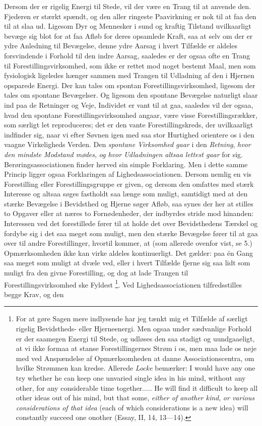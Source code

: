\documentclass[12pt,a4paper,openany]{book}
\newcommand{\opage}[1]{\marginnote{\footnotesize\textit{[#1]}}}
\begin{document}
Dersom der er rigelig Energi til Stede, vil der være en Trang til at anvende
den. Fjederen er stærkt spændt, og den aller ringeste Paavirkning er nok til at
faa den til at slaa ud. Ligesom Dyr og Mennesker i sund og kraftig Tilstand
uvilkaarligt bevæge sig blot for at faa Afløb for deres opsamlede Kraft, saa at
selv om der er ydre Anledning til
\setcounter{footnote}{0}%
\opage{54}Bevægelse, denne ydre Aarsag i hvert Tilfælde er aldeles forsvindende
i Forhold til den indre Aarsag, saaledes er der ogsaa ofte en Trang til
Forestillingsvirksomhed, som ikke er rettet mod noget bestemt Maal, men som
fysiologisk ligeledes hænger sammen med Trangen til Udladning af den i Hjernen
opsparede Energi. Der kan tales om spontan Forestillingsvirksomhed, ligesom der
tales om spontane Bevægelser. Og ligesom den spontane Bevægelse naturligt slaar
ind paa de Retninger og Veje, Individet er vant til at gaa, saaledes vil der
ogsaa, hvad den spontane Forestillingsvirksomhed angaar, være visse
Forestillingsrækker, som særligt let reproduceres; det er den vante
Forestillingskreds, der uvilkaarligt indfinder sig, naar vi efter Søvnen igen
med saa stor Hurtighed orientere os i den vaagne Virkeligheds Verden. Den
\emph{spontane Virksomhed gaar} i den \emph{Retning}, \emph{hvor den mindste
Modstand mødes}, \emph{og hvor Udladningen altsaa lettest gaar} for sig.
Berøringsassociationen finder herved sin simple Forklaring. Men i dette samme
Princip ligger ogsaa Forklaringen af Lighedsassociationen. Dersom nemlig en vis
Forestilling eller Forestillingsgruppe er given, og dersom den omfattes med
stærk Interesse og altsaa søges fastholdt saa længe som muligt, samtidigt med
at den stærke Bevægelse i Bevidsthed og Hjerne søger Afløb, saa synes der her
at stilles to Opgaver eller at næres to Fornødenheder, der indbyrdes stride mod
hinanden: Interessen ved det forestillede fører til at holde det over
Bevidsthedens Tærskel og fordybe sig i det saa meget som muligt, men den stærke
Bevægelse fører til at gaa over til andre Forestillinger, hvortil kommer, at
(som allerede ovenfor vist, se 5.) Opmærksomheden ikke kan virke aldeles
kontinuerligt. Det gælder: paa én Gang saa meget som muligt at dvæle ved, eller
i hvert Tilfælde fjerne sig saa lidt som muligt fra den givne Forestilling, og
dog at lade Trangen til Forestillingsvirksomhed ske Fyldest%
\footnote[1]{For at gøre Sagen mere indlysende har jeg tænkt mig et Tilfælde af
særligt rigelig Bevidstheds- eller Hjerneenergi. Men ogsaa under sædvanlige
Forhold er der saamegen Energi til Stede, og udløses den saa stadigt og
uundgaaeligt, at vi ikke formaa at stanse Forestillingernes Strøm i os, men maa
lade os nøje med ved Anspændelse af Opmærksomheden at danne Associationscentra,
om hvilke Strømmen kan kredse. Allerede \emph{Locke} bemærker: I would have any
one try whether he can keep one unvaried single idea in his mind, without any
other, for any considerable time together..... He will find it difficult to
keep all other ideas out of his mind, but that some, \emph{either of another
kind}, \emph{or various considerations of that idea} (each of which
considerations is a new idea) will constantly succeed one onother (Essay, II,
14, 13---14).}. Ved Lighedsassociationen tilfredsstilles begge Krav, og den
\end{document}
